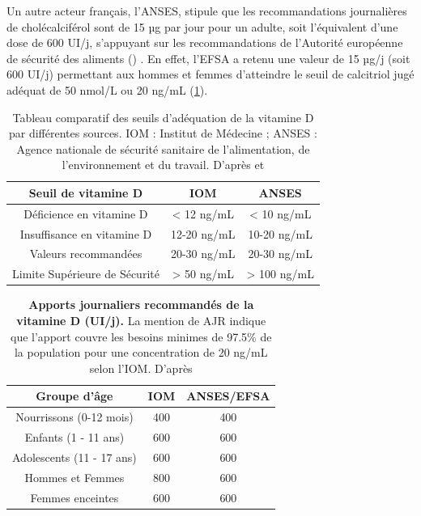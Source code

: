 \documentclass[
  a4paper,
  DIV=11,
  numbers=noendperiod,
  listof=totoc]{scrreprt}
\begin{document}
Un autre acteur français, l'\ac{ANSES}, stipule que les recommandations
journalières de cholécalciférol sont de 15 µg par jour pour un adulte,
soit l'équivalent d'une dose de 600 UI/j, s'appuyant sur les
recommandations de l'Autorité européenne de sécurité des aliments
() \autocite{ANSES.2021}. En effet, l'\ac{EFSA} a retenu une
valeur de 15 µg/j (soit 600 UI/j) permettant aux hommes et femmes
d'atteindre le seuil de calcitriol jugé adéquat de 50 nmol/L ou 20 ng/mL
\autocite{ANSES.2022} (\cref{tbl-seuil}).

\begin{table}
\caption[\textbf{Tableau comparatif des seuils d'adéquation de la vitamine D par différentes sources.}]{Tableau comparatif des seuils d'adéquation de la vitamine D par différentes sources. IOM : Institut de Médecine ; ANSES : Agence nationale de sécurité sanitaire de l’alimentation, de l’environnement et du travail. D'après \textcite{IOM.2011} et \textcite{ANSES.2021}}
\label{tbl-seuil}
\centering
\begin{tabular}{ccc}
\toprule
\textbf{Seuil de vitamine D} & \textbf{IOM} & \textbf{ANSES}\\
\midrule
Déficience en vitamine D & < 12 ng/mL & < 10 ng/mL\\
Insuffisance en vitamine D & 12-20 ng/mL & 10-20 ng/mL\\
Valeurs recommandées & 20-30 ng/mL & 20-30 ng/mL\\
Limite Supérieure de Sécurité & > 50 ng/mL  & > 100 ng/mL \\
\bottomrule
\end{tabular}
\end{table}

\begin{table}
\centering
\caption[{\textbf{Apports journaliers recommandés de la vitamine D (UI/j)}}]{\textbf{Apports journaliers recommandés de la vitamine D (UI/j).} La mention de \ac{AJR} indique que l'apport couvre les besoins minimes de 97.5\% de la population pour une concentration de 20 ng/mL selon l'\ac{IOM}. D'après \textcite{ANSES.2021, IOM.2011}}
\label{tbl-AJR}
\begin{tabular}{ccc}
\toprule
\textbf{Groupe d'âge} & \textbf{IOM} & \textbf{ANSES/EFSA} \\
\midrule
Nourrissons (0-12 mois) & 400 & 400 \\
Enfants (1 - 11 ans) & 600 & 600 \\
Adolescents (11 - 17 ans) & 600 & 600 \\
Hommes et Femmes & 800 & 600 \\
Femmes enceintes & 600 & 600 \\
\bottomrule
\end{tabular}
\end{table}
\end{document}
